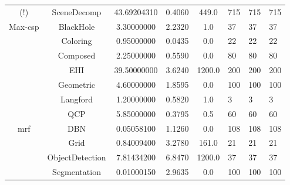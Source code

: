 \begin{table}
\begin{tabu}{ccS[round-mode=places,round-precision=3]
					  S[round-mode=places,round-precision=0]
					  S[round-mode=places,round-precision=0]HHH}
(!)				&	SceneDecomp	&	43.69204310	&	0.4060	&	449.0	&	715	&	715	&	715 \\
	Max-\acrshort{csp}	&	BlackHole	&	3.30000000	&	2.2320	&	1.0	&	37	&	37	&	37 \\
	&	Coloring	&	0.95000000	&	0.0435	&	0.0	&	22	&	22	&	22 \\
	&	Composed	&	2.25000000	&	0.5590	&	0.0	&	80	&	80	&	80 \\
	&	EHI	&	39.50000000	&	3.6240	&	1200.0	&	200	&	200	&	200 \\
	&	Geometric	&	4.60000000	&	1.8595	&	0.0	&	100	&	100	&	100 \\
	&	Langford	&	1.20000000	&	0.5820	&	1.0	&	3	&	3	&	3 \\
	&	QCP	&	5.85000000	&	0.3795	&	0.5	&	60	&	60	&	60 \\
	\acrshort{mrf}	&	DBN	&	0.05058100	&	1.1260	&	0.0	&	108	&	108	&	108 \\
	&	Grid	&	0.84009400	&	3.2780	&	161.0	&	21	&	21	&	21 \\
	&	ObjectDetection	&	7.81434200	&	6.8470	&	1200.0	&	37	&	37	&	37 \\
	&	Segmentation	&	0.01000150	&	2.9635	&	0.0	&	100	&	100	&	100 \\
		\bottomrule
	\end{tabu}
\end{table}

